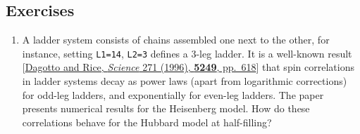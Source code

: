 \hypertarget{exercises}{%
\subsection{Exercises}\label{exercises}}

\begin{enumerate}
\def\labelenumi{\arabic{enumi}.}
\tightlist
\item
  A ladder system consists of chains assembled one next to the other,
  for instance, setting \texttt{L1=14}, \texttt{L2=3} defines a 3-leg
  ladder. It is a well-known result
  {[}\href{doi.org/10.1126/science.271.5249.618}{Dagotto and Rice,
  \emph{Science} 271 (1996), \textbf{5249}, pp.~618}{]} that spin
  correlations in ladder systems decay as power laws (apart from
  logarithmic corrections) for odd-leg ladders, and exponentially for
  even-leg ladders. The paper presents numerical results for the
  Heisenberg model. How do these correlations behave for the Hubbard
  model at half-filling?
\end{enumerate}


    
    
    
